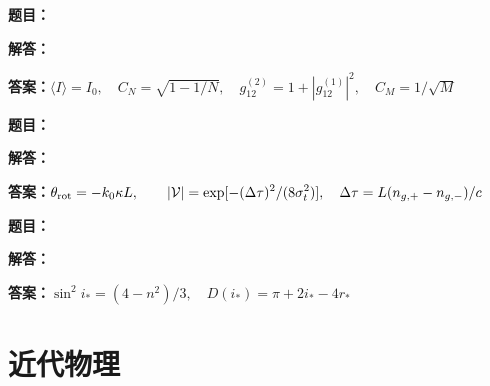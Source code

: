 \documentclass[lang=cn,color=blue,11pt]{elegantbook}
\begin{document}
\par\smallskip\noindent\hrulefill\par\medskip
{}\par
\noindent\textbf{题目：}
\par\noindent\textbf{解答：}
\par\noindent\textbf{答案：}\(\displaystyle \langle I\rangle=I_0,\quad C_N=\sqrt{1-1/N},\quad g^{(2)}_{12}=1+|g^{(1)}_{12}|^2,\quad C_M=1/\sqrt M\)\par
\par\smallskip\noindent\hrulefill\par\medskip
{}\par
\noindent\textbf{题目：}
\par\noindent\textbf{解答：}
\par\noindent\textbf{答案：}\(\displaystyle \theta_{\rm rot}=-k_0\kappa L,\qquad |\mathcal V|=\exp[-(\Delta\tau)^2/(8\sigma_t^2)],\quad \Delta\tau=L(n_{g,+}-n_{g,-})/c\)\par
\par\smallskip\noindent\hrulefill\par\medskip
{}\par
\noindent\textbf{题目：}
\par\noindent\textbf{解答：}
\par\noindent\textbf{答案：}\(\displaystyle \sin^2i_*=(4-n^2)/3,\quad D(i_*)=\pi+2i_*-4r_*\)\par
\par\smallskip\noindent\hrulefill\par\medskip
\chapter{近代物理}
\end{document}
